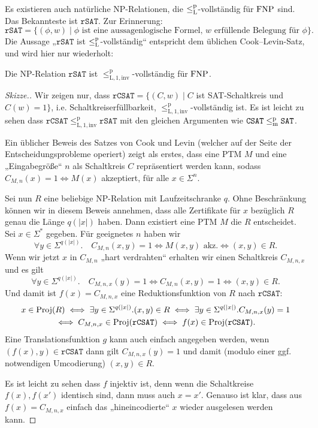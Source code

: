 Es existieren auch natürliche NP-Relationen, die $\leq_\mathrm{L}^\mathrm{p}$-vollständig für $\mathrm{FNP}$ sind.
Das Bekannteste ist $\mathtt{rSAT}$. Zur Erinnerung:
\[ \mathtt{rSAT} = \{ (\phi, w) \mid \text{$\phi$ ist eine aussagenlogische Formel, $w$ erfüllende Belegung für $\phi$} \}. \]
Die Aussage „$\mathtt{rSAT}$ ist $\leq_\mathrm{L}^\mathrm{p}$-vollständig“ entspricht dem üblichen Cook--Levin-Satz, und wird hier nur wiederholt:
\begin{theorem}
    Die NP-Relation $\mathtt{rSAT}$ ist $\leq_\mathrm{L,1,inv}^\mathrm p$-vollständig für $\mathrm{FNP}$.
\end{theorem}
\begin{proof}[Skizze.]
    Wir zeigen nur, dass $\mathtt{rCSAT}=\{(C, w) \mid C$ ist SAT-Schaltkreis und $C(w)=1\}$, i.e. Schaltkreiserfüllbarkeit, $\leq_\mathrm{L,1,inv}^\mathrm p$-vollständig ist. Es ist leicht zu sehen dass $\mathtt{rCSAT}\leq_\mathrm{L,1,inv}^\mathrm p \mathtt{rSAT}$ mit den gleichen Argumenten wie $\mathtt{CSAT}\leq_\mathrm{m}^\mathrm{p} \mathtt{SAT}$.

    Ein üblicher Beweis des Satzes von Cook und Levin (welcher auf der Seite der Entscheidungsprobleme operiert) zeigt als erstes, dass eine PTM $M$ und eine „Eingabegröße“ $n$ als Schaltkreis $C$ repräsentiert werden kann, sodass $C_{M,n}(x)=1 \iff M(x)$ akzeptiert, für alle $x\in\Sigma^{n}$.

    Sei nun $R$ eine beliebige NP-Relation mit Laufzeitschranke $q$. Ohne Beschränkung können wir in diesem Beweis annehmen, dass alle Zertifikate für $x$ bezüglich $R$ genau die Länge $q(|x|)$ haben. Dann existiert eine PTM $M$ die $R$ entscheidet. Sei $x\in\Sigma^*$ gegeben. Für geeignetes $n$ haben wir
    \[ \forall y\in\Sigma^{q(|x|)}.\quad C_{M,n}(x,y)=1 \iff M(x,y)\text{ akz.} \iff (x,y)\in R. \]
    Wenn wir jetzt $x$ in $C_{M,n}$ „hart verdrahten“ erhalten wir einen Schaltkreis $C_{M,n,x}$ und es gilt
    \[ \forall y\in\Sigma^{q(|x|)}.\quad C_{M,n,x}(y)=1 \iff C_{M,n}(x,y)=1 \iff (x,y)\in R. \]
    Und damit ist $f(x) = C_{M,n,x}$ eine Reduktionsfunktion von $R$ nach $\mathtt{rCSAT}$:
    \begin{gather*}
    x\in \operatorname{Proj}(R) \iff \exists  y\in\Sigma^{q(|x|)}.(x,y)\in R \iff \exists y\in\Sigma^{q(|x|)}.C_{M,n,x}(y)=1 \\\iff C_{M,n,x}\in\operatorname{Proj}(\mathtt{rCSAT}) \iff f(x)\in\operatorname{Proj}(\mathtt{rCSAT}). \end{gather*}
    Eine Translationsfunktion $g$ kann auch einfach angegeben werden, wenn $(f(x), y)\in \mathtt{rCSAT}$ dann gilt $C_{M,n,x}(y)=1$ und damit (modulo einer ggf. notwendigen Umcodierung) $(x,y)\in R$.

    Es ist leicht zu sehen dass $f$ injektiv ist, denn wenn die Schaltkreise $f(x), f(x')$ identisch sind, dann muss auch $x=x'$. Genauso ist klar, dass aus $f(x)=C_{M,n,x}$ einfach das „hineincodierte“ $x$ wieder ausgelesen werden kann.
\end{proof}

